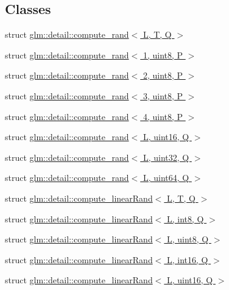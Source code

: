 \subsection*{Classes}
\begin{DoxyCompactItemize}
\item 
struct \hyperlink{structglm_1_1detail_1_1compute__rand}{glm\+::detail\+::compute\+\_\+rand$<$ L, T, Q $>$}
\item 
struct \hyperlink{structglm_1_1detail_1_1compute__rand_3_011_00_01uint8_00_01_p_01_4}{glm\+::detail\+::compute\+\_\+rand$<$ 1, uint8, P $>$}
\item 
struct \hyperlink{structglm_1_1detail_1_1compute__rand_3_012_00_01uint8_00_01_p_01_4}{glm\+::detail\+::compute\+\_\+rand$<$ 2, uint8, P $>$}
\item 
struct \hyperlink{structglm_1_1detail_1_1compute__rand_3_013_00_01uint8_00_01_p_01_4}{glm\+::detail\+::compute\+\_\+rand$<$ 3, uint8, P $>$}
\item 
struct \hyperlink{structglm_1_1detail_1_1compute__rand_3_014_00_01uint8_00_01_p_01_4}{glm\+::detail\+::compute\+\_\+rand$<$ 4, uint8, P $>$}
\item 
struct \hyperlink{structglm_1_1detail_1_1compute__rand_3_01_l_00_01uint16_00_01_q_01_4}{glm\+::detail\+::compute\+\_\+rand$<$ L, uint16, Q $>$}
\item 
struct \hyperlink{structglm_1_1detail_1_1compute__rand_3_01_l_00_01uint32_00_01_q_01_4}{glm\+::detail\+::compute\+\_\+rand$<$ L, uint32, Q $>$}
\item 
struct \hyperlink{structglm_1_1detail_1_1compute__rand_3_01_l_00_01uint64_00_01_q_01_4}{glm\+::detail\+::compute\+\_\+rand$<$ L, uint64, Q $>$}
\item 
struct \hyperlink{structglm_1_1detail_1_1compute__linear_rand}{glm\+::detail\+::compute\+\_\+linear\+Rand$<$ L, T, Q $>$}
\item 
struct \hyperlink{structglm_1_1detail_1_1compute__linear_rand_3_01_l_00_01int8_00_01_q_01_4}{glm\+::detail\+::compute\+\_\+linear\+Rand$<$ L, int8, Q $>$}
\item 
struct \hyperlink{structglm_1_1detail_1_1compute__linear_rand_3_01_l_00_01uint8_00_01_q_01_4}{glm\+::detail\+::compute\+\_\+linear\+Rand$<$ L, uint8, Q $>$}
\item 
struct \hyperlink{structglm_1_1detail_1_1compute__linear_rand_3_01_l_00_01int16_00_01_q_01_4}{glm\+::detail\+::compute\+\_\+linear\+Rand$<$ L, int16, Q $>$}
\item 
struct \hyperlink{structglm_1_1detail_1_1compute__linear_rand_3_01_l_00_01uint16_00_01_q_01_4}{glm\+::detail\+::compute\+\_\+linear\+Rand$<$ L, uint16, Q $>$}

\end{DoxyCompactItemize}
